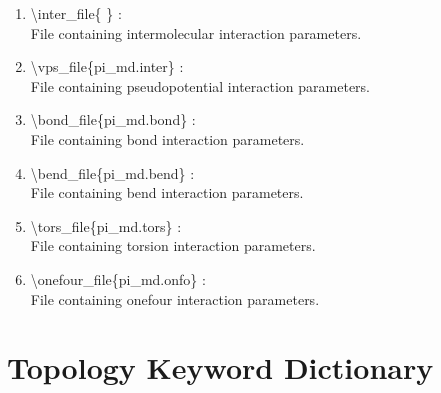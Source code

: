 \documentclass[12pt,titlepage]{article}
\begin{document}
\begin{enumerate}

 \vspace{0.15in} 
 \item  \textbackslash inter\_file\{ \} : \\
    File containing intermolecular interaction parameters.

 \vspace{0.15in} 
 \item  \textbackslash vps\_file\{pi\_md.inter\} : \\
    File containing pseudopotential interaction parameters.

 \vspace{0.15in} 
 \item  \textbackslash bond\_file\{pi\_md.bond\} : \\
    File containing bond interaction parameters.

 \vspace{0.15in} 
 \item  \textbackslash bend\_file\{pi\_md.bend\} : \\
    File containing bend interaction parameters.

 \vspace{0.15in} 
 \item  \textbackslash tors\_file\{pi\_md.tors\} : \\
    File containing torsion interaction parameters.

 \vspace{0.15in} 
 \item  \textbackslash onefour\_file\{pi\_md.onfo\} : \\
    File containing onefour interaction parameters.

\end{enumerate}

\newpage


\section{\bf Topology Keyword Dictionary} 
\end{document}
